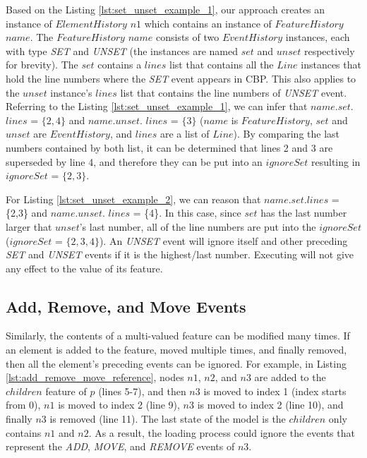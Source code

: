 \documentclass{llncs}
\begin{document}
Based on the Listing \ref{lst:set_unset_example_1}, our approach creates an instance of $ElementHistory$ $n1$ which contains an instance of $FeatureHistory$ $name$. The $FeatureHistory$ $name$ consists of two $EventHistory$ instances, each with type \textit{SET} and \textit{UNSET} (the instances are named $set$ and $unset$ respectively for brevity). The $set$ contains a $lines$ list that contains all the $Line$ instances that hold the line numbers where the \textit{SET} event appears in CBP. This also applies to the $unset$ instance's $lines$ list that contains the line numbers of \textit{UNSET} event. Referring to the Listing \ref{lst:set_unset_example_1}, we can infer that $name$.$set$.$lines$ = $\{2,4\}$ and $name$.$unset$. $lines$ = $\{3\}$ ($name$ is $FeatureHistory$, $set$ and $unset$ are $EventHistory$, and $lines$ are a list of $Line$). By comparing the last numbers contained by both list, it can be determined that lines 2 and 3 are superseded by line 4, and therefore they can be put into an $ignoreSet$ resulting in $ignoreSet$ = $\{2, 3\}$.

For Listing \ref{lst:set_unset_example_2}, we can reason that $name$.$set$.$lines$ = \{2,3\} and $name$.$unset$. $lines$ = \{4\}.  In this case, since $set$ has the last number larger that $unset$'s last number, all of the line numbers are put into the $ignoreSet$ ($ignoreSet$ = $\{2, 3, 4\}$). An \textit{UNSET} event will ignore itself and other preceding \textit{SET} and \textit{UNSET} events if it is the highest/last number. Executing will not give any effect to the value of its feature.

\subsection{Add, Remove, and Move Events}\label{subsec:add_remove_and_move_operations}
Similarly, the contents of a multi-valued feature can be modified many times. If an element is added to the feature, moved multiple times, and finally removed, then all the element's preceding events can be ignored. For example, in Listing \ref{lst:add_remove_move_reference},  nodes $n1$, $n2$, and $n3$ are added to the $children$ feature of $p$ (lines 5-7), and then $n3$ is moved to index 1 (index starts from 0), $n1$ is moved to index 2 (line 9), $n3$ is moved to index 2 (line 10), and finally $n3$ is removed (line 11). The last state of the model is the $children$ only contains $n1$ and $n2$. As a result, the loading process could ignore the events that represent the \textit{ADD}, \textit{MOVE}, and \textit{REMOVE} events of $n3$. 
\end{document}

